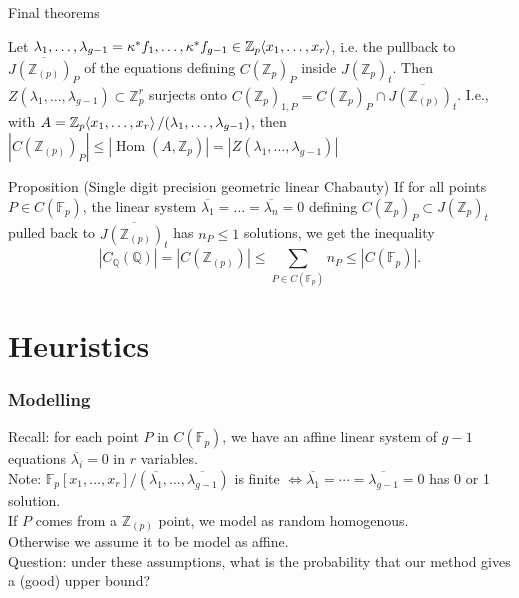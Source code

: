 \documentclass[15pt]{beamer}
\newcommand{\Z}{\mathbb{Z}}
\newcommand{\Q}{\mathbb{Q}}
\newcommand{\F}{\mathbb{F}}
\renewcommand{\angle}[1]{\hspace{-2pt}\left\langle #1 \right\rangle}
\DeclareMathOperator{\Hom}{Hom}
\begin{document}
\begin{frame}{Final theorems}
    \begin{definition}
        Let $\lambda_1,\dots,\lambda_{g-1} = \kappa^* f_1,\dots,\kappa^* f_{g-1} \in \Z_p\angle{x_1,\dots,x_r}$, i.e. the pullback to $\overline{J(\Z_{(p)})_P}$ of the equations defining $C(\Z_p)_P$ inside $J(\Z_p)_t$. Then $Z(\lambda_1,\dots,\lambda_{g-1}) \subset \Z_p^r$ surjects onto $C(\Z_p)_{1,P} = C(\Z_p)_P \cap \overline{J(\Z_{(p)})_t}$. I.e., with $A = \Z_p\angle{x_1,\dots,x_r}/(\lambda_1,\dots,\lambda_{g-1})$, then $|C(\Z_{(p)})_P| \leq |\Hom(A,\Z_p)| = |Z(\lambda_1,\dots,\lambda_{g-1})|$
    \end{definition}
    \begin{block}{Proposition (Single digit precision geometric linear Chabauty)}
    If for all points $P \in C(\F_p)$, the linear system $\overline{\lambda_1}=\dots=\overline{\lambda_n} = 0$ defining $C(\Z_p)_P \subset J(\Z_p)_t$ pulled back to $\overline{J(\Z_{(p)})_t}$ has $n_P \leq 1$ solutions, we get the inequality
    \[
    |C_{\Q}(\Q)| = |C(\Z_{(p)})| \leq \sum_{P \in C(\F_p)} n_P \leq |C(\F_p)|. 
    \]
    \end{block}
\end{frame}

\section{Heuristics}
\begin{frame}
    \frametitle{Modelling}
    Recall: for each point $P$ in $C(\F_p)$, we have an affine linear system of $g-1$ equations $\overline{\lambda_i} = 0$ in $r$ variables.\\\pause
    Note: $\F_p[x_1,\dots,x_r]/(\overline{\lambda_1},\dots,\overline{\lambda_{g-1}})$ is finite $\Leftrightarrow \overline{\lambda_1} = \cdots = \overline{\lambda_{g-1}} = 0$ has 0 or 1 solution.\\\pause
    If $P$ comes from a $\Z_{(p)}$ point, we model as random homogenous.\\\pause
    Otherwise we assume it to be model as affine.\\\pause
    Question: under these assumptions, what is the probability that our method gives a (good) upper bound?
\end{frame}
\end{document}

